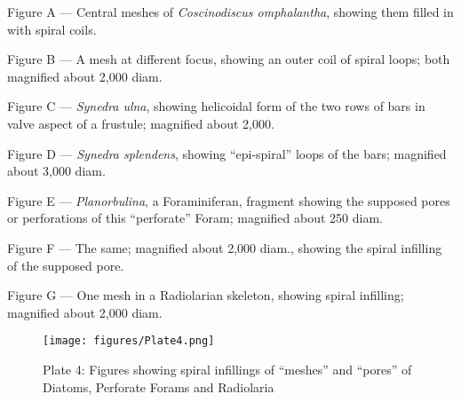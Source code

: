 \documentclass[a4paper, 12pt, oneside]{article}
\begin{document}
\begin{description}
\item Figure A --- Central meshes of \emph{Coscinodiscus omphalantha}, showing them filled in with spiral coils.
\item Figure B --- A mesh at different focus, showing an outer coil of spiral loops; both magnified about 2,000 diam.
\item Figure C --- \emph{Synedra ulna}, showing helicoidal form of the two rows of bars in valve aspect of a frustule; magnified about 2,000.
\item Figure D --- \emph{Synedra splendens}, showing ``epi-spiral'' loops of the bars; magnified about 3,000 diam.
\item Figure E --- \emph{Planorbulina}, a Foraminiferan, fragment showing the supposed pores or perforations of this ``perforate'' Foram; magnified about 250 diam.
\item Figure F --- The same; magnified about 2,000 diam., showing the spiral infilling of the supposed pore.
\item Figure G --- One mesh in a Radiolarian skeleton, showing spiral infilling; magnified about 2,000 diam.
\end{description}
\clearpage
\begin{figure}[b]
\centering
\texttt{[image: figures/Plate4.png]}
\caption{\small Plate 4: Figures showing spiral infillings of ``meshes'' and ``pores'' of Diatoms, Perforate Forams and Radiolaria}
\end{figure}
\clearpage
\end{document}
